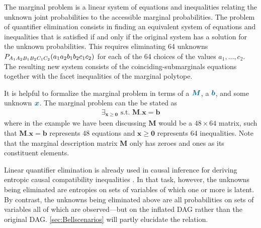 {The marginal problem is a linear system of equations and inequalities relating the unknown joint probabilities to the accessible marginal probabilities. The problem of quantifier elimination consists in finding an equivalent system of equations and inequalities that is satisfied if and only if the original system has a solution for the unknown probabilities. This requires eliminating 64 unknowns $\p[A_1 A_2 B_1 B_2 C_1 C_2]{a_1 a_2 b_1 b_2 c_1 c_2}$ for each of the 64 choices of the values $a_1,\ldots,c_2$. The resulting new system consists of the coinciding-submarginals equations together with the facet inequalities of the marginal polytope.

It is helpful to formalize the marginal problem in terms of a  $\mblue{\bm{M}}$, a  $\mblue{\bm{b}}$, and some unknown  $\mblue{\bm{x}}$. The marginal problem can the be stated as
\begin{align}\label{eq:marginalproblemgeneric}
    \exists_{\bm{x} \bm{\geq} \bm{0}} \text{ s.t. }\bm{M}.\bm{x}\bm{=}\bm{b}
\end{align}
where in the example we have been discussing $\bm{M}$ would be a $48\times 64$ matrix, such that $\bm{M}.\bm{x}\bm{=}\bm{b}$ represents 48 equations and $\bm{x} \bm{\geq} \bm{0}$ represents 64 inequalities. Note that the marginal description matrix $\bm{M}$ only has zeroes and ones as its constituent elements.

Linear quantifier elimination is already used in causal inference for deriving entropic causal compatibility inequalities \cite{chaves2014novel,chaves2014informationinference}. In that task, however, the unknowns being eliminated are entropies on sets of variables of which one or more is latent. By contrast, the unknowns being eliminated above are all probabilities on sets of variables all of which are observed---but on the inflated DAG rather than the original DAG.
\cref{sec:Bellscenarios} will partly elucidate the relation.

}
